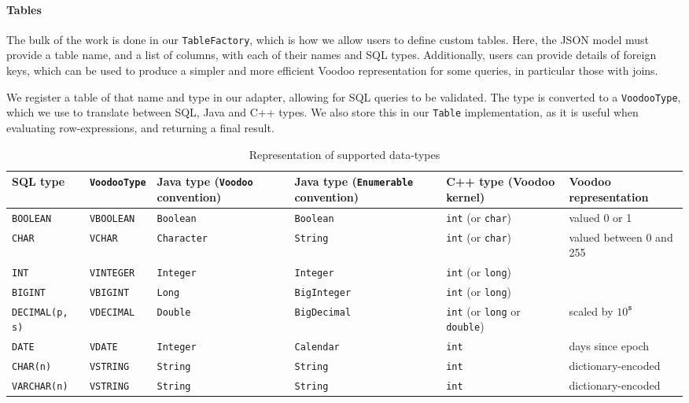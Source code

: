 \paragraph{Tables}

The bulk of the work is done in our \texttt{TableFactory}, which is how we allow users to define custom tables. Here, the JSON model must provide a table name, and a list of columns, with each of their names and SQL types. Additionally, users can provide details of foreign keys, which can be used to produce a simpler and more efficient Voodoo representation for some queries, in particular those with joins.

We register a table of that name and type in our adapter, allowing for SQL queries to be validated. The type is converted to a \texttt{VoodooType}, which we use to translate between SQL, Java and C++ types. We also store this in our \texttt{Table} implementation, as it is useful when evaluating row-expressions, and returning a final result.

\begin{table}
    \centering
    \begin{tabularx}{\linewidth}{l l L L L H}
        \hline
        SQL type & \texttt{VoodooType} & Java type (\texttt{Voodoo} convention) & Java type (\texttt{Enumerable} convention) & C++ type (Voodoo kernel) & Voodoo representation \\
        \hline
        \texttt{BOOLEAN} & \texttt{VBOOLEAN} & \texttt{Boolean} & \texttt{Boolean} & \texttt{int} (or \texttt{char}) & valued 0 or 1 \\
        \texttt{CHAR} & \texttt{VCHAR} & \texttt{Character} & \texttt{String} & \texttt{int} (or \texttt{char}) & valued between 0 and 255 \\
        \texttt{INT} & \texttt{VINTEGER} & \texttt{Integer} & \texttt{Integer} & \texttt{int} (or \texttt{long}) &  \\
        \texttt{BIGINT} & \texttt{VBIGINT} & \texttt{Long} & \texttt{BigInteger} & \texttt{int} (or \texttt{long}) &  \\
        \texttt{DECIMAL(p, s)} & \texttt{VDECIMAL} & \texttt{Double} & \texttt{BigDecimal} & \texttt{int} (or \texttt{long} or \texttt{double}) & scaled by $10^\texttt{s}$ \\
        \texttt{DATE} & \texttt{VDATE} & \texttt{Integer} & \texttt{Calendar} & \texttt{int} & days since epoch \\
        \texttt{CHAR(n)} & \texttt{VSTRING} & \texttt{String} & \texttt{String} & \texttt{int} & dictionary-encoded \\
        \texttt{VARCHAR(n)} & \texttt{VSTRING} & \texttt{String} & \texttt{String} & \texttt{int} & dictionary-encoded \\
        \hline
    \end{tabularx}
    \caption{Representation of supported data-types}
    \label{tab:types}
\end{table}

